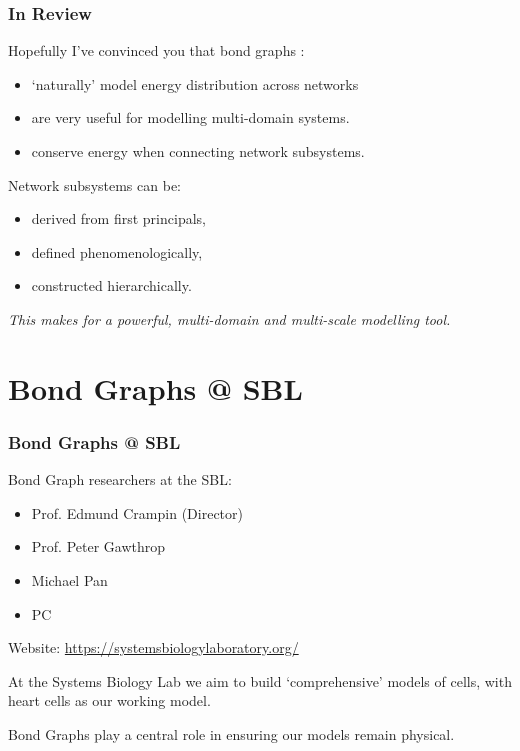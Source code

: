 \documentclass[11pt,reqno]{beamer}
\begin{document}
\begin{frame}
\frametitle{In Review}
Hopefully I've convinced you that bond graphs :
\begin{itemize}
	\item `naturally' model energy distribution across networks
	\item are very useful for modelling multi-domain systems.
	\item conserve energy when connecting network subsystems.
\end{itemize}
\vspace{22pt}

Network subsystems can be:
\begin{itemize}
	\item derived from first principals,
	\item defined phenomenologically, 
	\item constructed hierarchically.
\end{itemize}
\emph{This makes for a powerful, multi-domain and multi-scale modelling tool.}
\end{frame}
\section{Bond Graphs @ SBL}
\begin{frame}
\frametitle{Bond Graphs @ SBL}
Bond Graph researchers at the SBL:
\begin{itemize}
	\item Prof. Edmund Crampin (Director)
	\item Prof. Peter Gawthrop
	\item Michael Pan
	\item PC
\end{itemize}
\begin{small}

Website: \url{https://systemsbiologylaboratory.org/}\\
	\vspace{10pt}
	
At the Systems Biology Lab we aim to build `comprehensive' models of cells, with heart cells as our working model.\\
\vspace{10pt}

Bond Graphs play a central role in ensuring our models remain physical.
\end{small}
\end{frame}
\end{document}
